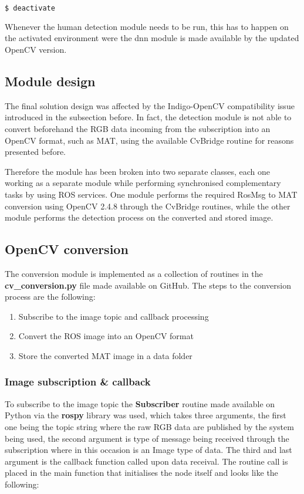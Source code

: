 \begin{lstlisting}[language=bash]
	$ deactivate
\end{lstlisting}

Whenever the human detection module needs to be run, this has to happen on the activated environment were the dnn module is made available by the updated OpenCV version.

\subsection{Module design}

The final solution design was affected by the Indigo-OpenCV compatibility issue introduced in the subsection before. In fact, the detection module is not able to convert beforehand the RGB data incoming from the subscription into an OpenCV format, such as MAT, using the available CvBridge routine for reasons presented before.

Therefore the module has been broken into two separate classes, each one working as a separate module while performing synchronised complementary tasks by using ROS services. One module performs the required RosMsg to MAT conversion using OpenCV 2.4.8 through the CvBridge routines, while the other module performs the detection process on the converted and stored image. 

\subsection{OpenCV conversion}

The conversion module is implemented as a collection of routines in the \textbf{cv\_conversion.py} file made available on GitHub. The steps to the conversion process are the following:

\begin{enumerate}
  \item Subscribe to the image topic and callback processing
  \item Convert the ROS image into an OpenCV format
  \item Store the converted MAT image in a data folder
\end{enumerate}

\subsubsection{Image subscription \& callback}

To subscribe to the image topic the \textbf{Subscriber} routine made available on Python via the \textbf{rospy} library was used, which takes three arguments, the first one being the topic string where the raw RGB data are published by the system being used, the second argument is type of message being received through the subscription where in this occasion is an Image type of data. The third and last argument is the callback function called upon data receival. The routine call is placed in the main function that initialises the node itself and looks like the following:

